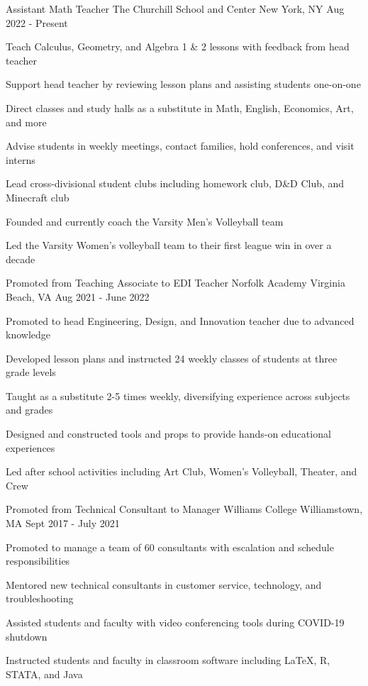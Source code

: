 \begin{cventries}
  \cventry
  {Assistant Math Teacher}
  {The Churchill School and Center}
  {New York, NY}
  {Aug 2022 - Present}
  {
    \begin{cvitems}
      \item {Teach Calculus, Geometry, and Algebra 1 \& 2 lessons with feedback from head teacher}
      \item {Support head teacher by reviewing lesson plans and assisting students one-on-one}
      \item {Direct classes and study halls as a substitute in Math, English, Economics, Art, and more}
      \item {Advise students in weekly meetings, contact families, hold conferences, and visit interns}
      \item {Lead cross-divisional student clubs including homework club, D\&D Club, and Minecraft club}
      \item {Founded and currently coach the Varsity Men's Volleyball team}
      \item {Led the Varsity Women's volleyball team to their first league win in over a decade}
    \end{cvitems}
  }

  \cventry
  {Promoted from Teaching Associate to EDI Teacher}
  {Norfolk Academy}
  {Virginia Beach, VA}
  {Aug 2021 - June 2022}
  {
    \begin{cvitems}
      \item {Promoted to head Engineering, Design, and Innovation teacher due to advanced knowledge}
      \item {Developed lesson plans and instructed 24 weekly classes of students at three grade levels}
      \item {Taught as a substitute 2-5 times weekly, diversifying experience across subjects and grades}
      \item {Designed and constructed tools and props to provide hands-on educational experiences}
      \item {Led after school activities including Art Club, Women's Volleyball, Theater, and Crew}
    \end{cvitems}
  }

  \cventry
  {Promoted from Technical Consultant to Manager}
  {Williams College}
  {Williamstown, MA}
  {Sept 2017 - July 2021}
  {
    \begin{cvitems}
      \item {Promoted to manage a team of 60 consultants with escalation and schedule responsibilities}
      \item {Mentored new technical consultants in customer service, technology, and troubleshooting}
      \item {Assisted students and faculty with video conferencing tools during COVID-19 shutdown}
      \item {Instructed students and faculty in classroom software including LaTeX, R, STATA, and Java}
    \end{cvitems}
  }


\end{cventries}
